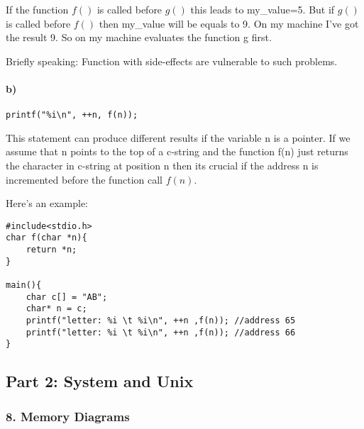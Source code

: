 \documentclass[12pt]{article}
\begin{document}
If the function $f()$ is called before $g()$ this leads to my\_value=5. But if $g()$ is called before $f()$ then my\_value will be equals to 9.
On my machine I've got the result 9. So on my machine evaluates the function g first.

Briefly speaking: Function with side-effects are vulnerable to such problems.

\paragraph{b)} 
\begin{lstlisting}
printf("%i\n", ++n, f(n));
\end{lstlisting}
This statement can produce different results if the variable n is a pointer.
If we assume that n points to the top of a c-string and the function f(n) just returns the character in c-string at position n then its crucial if the address n is incremented before the function call $f(n)$.

Here's an example:
\begin{lstlisting}
#include<stdio.h>
char f(char *n){
	return *n;
}

main(){
	char c[] = "AB";
	char* n = c;
	printf("letter: %i \t %i\n", ++n ,f(n)); //address 65
	printf("letter: %i \t %i\n", ++n ,f(n)); //address 66
}
\end{lstlisting}

\subsection*{Part 2: System and Unix}
\subsubsection*{8. Memory Diagrams}
\end{document}
